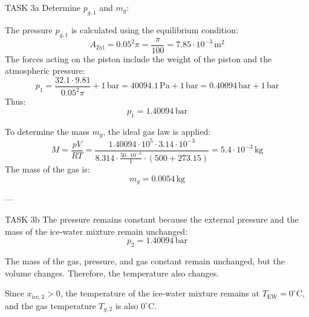 TASK 3a  
Determine \( p_{g,1} \) and \( m_g \):  

The pressure \( p_{g,1} \) is calculated using the equilibrium condition:  
\[
A_{\text{Zyl}} = 0.05^2 \pi = \frac{\pi}{100} = 7.85 \cdot 10^{-3} \, \text{m}^2
\]  
The forces acting on the piston include the weight of the piston and the atmospheric pressure:  
\[
p_1 = \frac{32.1 \cdot 9.81}{0.05^2 \pi} + 1 \, \text{bar} = 40094.1 \, \text{Pa} + 1 \, \text{bar} = 0.40094 \, \text{bar} + 1 \, \text{bar}
\]  
Thus:  
\[
p_1 = 1.40094 \, \text{bar}
\]  

To determine the mass \( m_g \), the ideal gas law is applied:  
\[
M = \frac{p V}{R T} = \frac{1.40094 \cdot 10^5 \cdot 3.14 \cdot 10^{-3}}{8.314 \cdot \frac{50 \cdot 10^{-3}}{1} \cdot (500 + 273.15)} = 5.4 \cdot 10^{-3} \, \text{kg}
\]  
The mass of the gas is:  
\[
m_g = 0.0054 \, \text{kg}
\]  

---

TASK 3b  
The pressure remains constant because the external pressure and the mass of the ice-water mixture remain unchanged:  
\[
p_2 = 1.40094 \, \text{bar}
\]  

The mass of the gas, pressure, and gas constant remain unchanged, but the volume changes. Therefore, the temperature also changes.  

Since \( x_{\text{ice},2} > 0 \), the temperature of the ice-water mixture remains at \( T_{\text{EW}} = 0^\circ\text{C} \), and the gas temperature \( T_{g,2} \) is also \( 0^\circ\text{C} \).